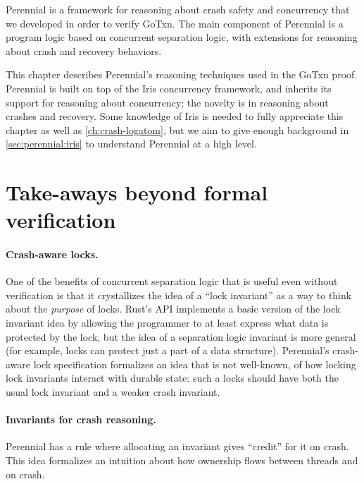 Perennial is a framework for reasoning about crash safety and concurrency that
we developed in order to verify GoTxn. The main component of Perennial is a
program logic based on concurrent separation logic, with extensions for
reasoning about crash and recovery behaviors.

This chapter describes Perennial's reasoning techniques used in the GoTxn proof.
Perennial is built on top of the Iris concurrency framework, and inherits its
support for reasoning about concurrency; the novelty is in reasoning about
crashes and recovery. Some knowledge of Iris is needed to fully appreciate this
chapter as well as \cref{ch:crash-logatom}, but we aim to give enough background
in \cref{sec:perennial:iris} to understand Perennial at a high level.





\section{Take-aways beyond formal verification}

\paragraph{Crash-aware locks.} One of the benefits of concurrent separation
logic that is useful even without verification is that it crystallizes the idea
of a ``lock invariant'' as a way to think about the \emph{purpose} of locks.
Rust's  API implements a basic version of the lock invariant
idea by allowing the programmer to at least express what data is protected by
the lock, but the idea of a separation logic invariant is more general (for
example, locks can protect just a part of a data structure). Perennial's
crash-aware lock specification formalizes an idea that is not well-known, of how
locking lock invariants interact with durable state: such a locks should have
both the usual lock invariant and a weaker crash invariant.

\paragraph{Invariants for crash reasoning.} Perennial has a rule where
allocating an invariant gives ``credit'' for it on crash. This idea formalizes
an intuition about how ownership flows between threads and on crash. 


